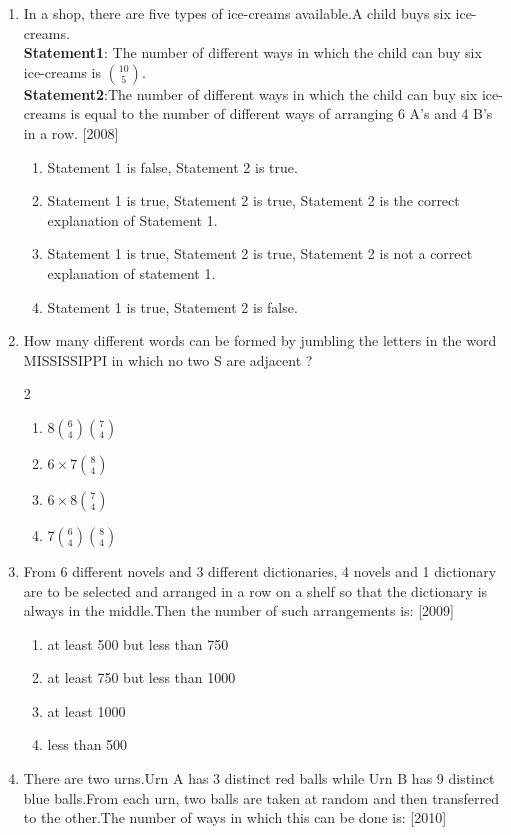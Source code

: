 \documentclass[journal,12pt,twocolumn]{IEEEtran}
\theoremstyle{remark}
\begin{document}
\begin{enumerate}
\begin{multicols}{2}
	\end{multicols}
\item In a shop, there are five types of ice-creams available.A child buys six ice-creams.\\\textbf{Statement1}: The number of different ways in which the child can buy six ice-creams is $10\choose5$.\\\textbf{Statement2}:The number of different ways in which the child can buy six ice-creams is equal to the number of different ways of arranging 6 A's and 4 B's in a row. \hfill[2008]
 \begin{enumerate}
     \item Statement 1 is false, Statement 2 is true.
     \item Statement 1 is true, Statement 2 is true, Statement 2 is the correct explanation of Statement 1.
     \item Statement 1 is true, Statement 2 is true, Statement 2 is not a correct explanation of statement 1.
     \item Statement 1 is true, Statement 2 is false.
 \end{enumerate}
\item  How many different words can be formed by jumbling the letters in the word MISSISSIPPI in which no two S are adjacent ?
	\begin{multicols}{2}
	\begin{enumerate}
     \item 8$6\choose4$$7\choose4$
     \item $6\times7$$8\choose4$
     \item $6\times8$$7\choose4$
     \item 7$6\choose4$$8\choose4$
        \end{enumerate}
	\end{multicols}
\item From 6 different novels and 3 different dictionaries, 4 novels and 1 dictionary are to be selected and arranged in a row on a shelf so that the dictionary is always in the middle.Then the number of such arrangements is: \hfill[2009]
 \begin{enumerate}
     \item at least 500 but less than 750
     \item at least 750 but less than 1000
     \item at least 1000
     \item less than 500
 \end{enumerate}
\item There are two urns.Urn A has 3 distinct red balls while Urn B has 9 distinct blue balls.From each urn, two balls are taken at random and then transferred to the other.The number of ways in which this can be done is: \hfill[2010]

\end{enumerate}
\end{document}
